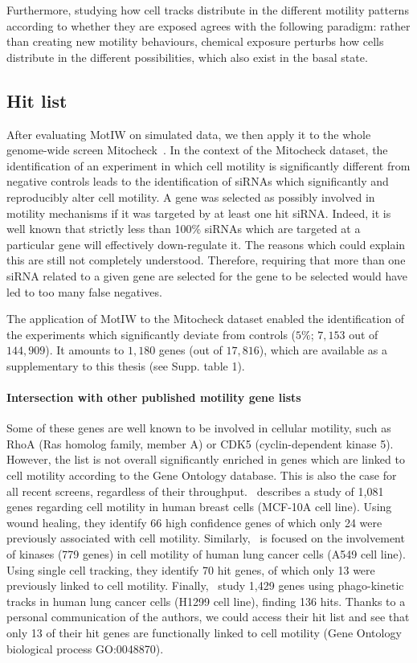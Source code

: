 Furthermore, studying how cell tracks distribute in the different motility patterns according to whether they are exposed agrees with the following paradigm: rather than creating new
motility behaviours, chemical exposure perturbs how cells distribute in the different possibilities, which also exist in the basal state.
\subsection{Hit list}
\label{sec:hitlist}
After evaluating MotIW on simulated data, we then apply it to the whole genome-wide screen Mitocheck~\cite{pmid20360735}. In the context of the Mitocheck dataset, the identification of an experiment in which cell motility is significantly different from negative controls leads to the identification of siRNAs which significantly and reproducibly alter cell motility. A gene was selected as possibly involved in motility mechanisms if it was targeted by at least one hit siRNA. Indeed, it is well known that strictly less than 100\% siRNAs which are targeted at a particular gene will effectively down-regulate it. The reasons which could explain this are still not completely understood. Therefore, requiring that more than one siRNA related to a given gene are selected for the gene to be selected would have led to too many false negatives.%

The application of MotIW to the Mitocheck dataset enabled the identification of the experiments which significantly deviate from controls ($5\%$; $7,153$ out of $144,909$). It amounts to $1,180$ genes (out of $17,816$), which are available as a supplementary to this thesis (see Supp. table 1).%

\paragraph{Intersection with other published motility gene lists}
Some of these genes are well known to be involved in cellular motility, such as RhoA (Ras homolog family, member A) or CDK5 (cyclin-dependent kinase 5). However, the list is not overall significantly enriched in genes which are linked to cell motility according to the Gene Ontology database. This is also the case for all recent screens, regardless of their throughput.~\cite{pmid19160483} describes a study of 1,081 genes regarding cell motility in human breast cells (MCF-10A cell line). Using wound healing, they identify 66 high confidence genes of which only 24 were previously associated with cell motility. Similarly,~\cite{pmid21423205} is focused on the involvement of kinases (779 genes) in cell motility of human lung cancer cells (A549 cell line). Using single cell tracking, they identify 70 hit genes, of which only 13 were previously linked to cell motility. Finally,~\cite{pmid25774502} study 1,429 genes using phago-kinetic tracks in human lung cancer cells (H1299 cell line), finding 136 hits. Thanks to a personal communication of the authors, we could access their hit list and see that only 13 of their hit genes are functionally linked to cell motility (Gene Ontology biological process GO:0048870). 


